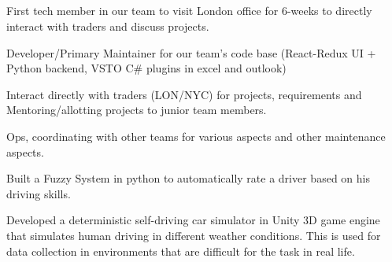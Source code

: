 \documentclass[letterpaper]{deedy-resume} %
\begin{document}
\begin{minipage}[t]{0.66\textwidth} %

\subsection{}

\vspace{\topsep} %
\begin{tightitemize}
\item First tech member in our team to visit London office for 6-weeks to directly interact with traders and discuss projects.
\item Developer/Primary Maintainer for our team's code base (React-Redux UI + Python backend, VSTO C\# plugins in excel and outlook)
\item Interact directly with traders (LON/NYC) for projects, requirements and Mentoring/allotting projects to junior team members.
\item Ops, coordinating with other teams for various aspects and other maintenance aspects.
\end{tightitemize}

\sectionspace %



\begin{tightitemize}
\item Built a Fuzzy System in python to automatically rate a driver based on his driving skills.
\item Developed a deterministic self-driving car simulator in Unity 3D game engine that simulates human driving in different weather conditions. This is used for data collection in environments that are difficult for the task in real life.
\end{tightitemize}

\sectionspace %



\end{minipage}
\end{document}
